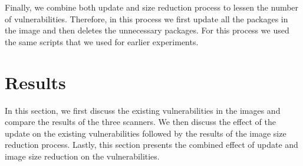 \documentclass[a4paper,num-refs]{oup-contemporary}
\begin{document}
{Finally, we combine both update and size reduction process
to lessen the number of vulnerabilities.
Therefore, in this process we first update all the packages in the image and then deletes
the unnecessary packages. For this process we used the same scripts that
we used for earlier experiments.}

\section{Results}

In this section,
we first discuss the existing vulnerabilities in the images and compare the
results of the three scanners. We then discuss the effect of the update on the
existing vulnerabilities followed by the results of the image size reduction
process. Lastly, this section presents the combined effect of update and image size reduction on the
vulnerabilities.
\end{document}
